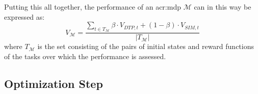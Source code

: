 \noindent Putting this all together, the performance of an \acrshort{acr:mdp} $\mathcal{M}$ can in this way be expressed as:
\begin{equation}
\label{eq:vm}
V_{\mathcal{M}} = \frac{\sum_{t \in T_\mathcal{M}} \beta \cdot V_{\mathit{DTP}, t} + (1 - \beta) \cdot V_{\mathit{SIM}, t}}{|T_\mathcal{M}|}
\end{equation}
where $T_\mathcal{M}$ is the set consisting of the pairs of initial states and reward functions of the tasks over which the performance is assessed.


\subsection{Optimization Step}
\label{sec:optimization-step}

